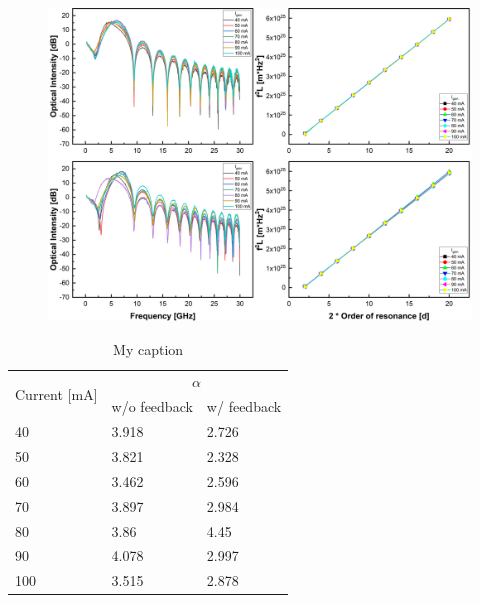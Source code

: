 \begin{figure}[ht]
    \centering
    \includegraphics[width=\linewidth]{figures/chirp_cleaved_and_lensed_4679.png}
    \caption{}
    \label{fig:chirp_cleaved_and_lensed}
\end{figure}


\begin{table}[ht]
    \centering
    \caption{My caption}
    \label{tab:chirp_cleaved_and_lensed}
    \begin{tabular}{|l|l|l|}
    \hline
    \multirow{2}{*}{Current {[}mA{]}} & \multicolumn{2}{c|}{$\alpha$} \\ \cline{2-3} 
                                      & w/o feedback   & w/ feedback  \\ \hline
    40                                & 3.918          & 2.726        \\
    50                                & 3.821          & 2.328        \\
    60                                & 3.462          & 2.596        \\
    70                                & 3.897          & 2.984        \\
    80                                & 3.86           & 4.45         \\
    90                                & 4.078          & 2.997        \\
    100                               & 3.515          & 2.878        \\ \hline
    \end{tabular}
\end{table}

